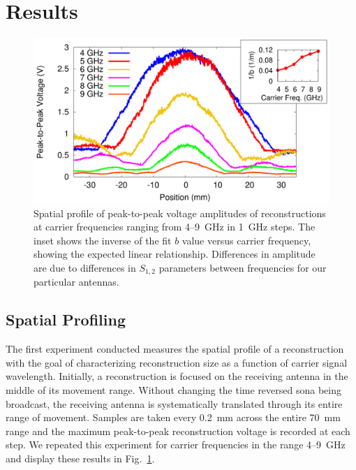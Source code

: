 \section{Results}


\begin{figure}[t!]
\includegraphics[width=\columnwidth]{figs/freq_profile.pdf}
\caption{Spatial profile of peak-to-peak voltage amplitudes of reconstructions
at carrier frequencies ranging from \numrange{4}{9}~GHz in 1~GHz
steps. The inset shows the inverse of the fit $b$ value versus carrier
frequency, showing the expected linear relationship. Differences in amplitude
are due to differences in $S_{1,2}$ parameters between frequencies for our particular antennas.}
\label{fig:freq_profile}
\end{figure}


\subsection{Spatial Profiling}
\label{sec:spatial}

The first experiment conducted measures the spatial profile of a reconstruction
with the goal of characterizing reconstruction size as a function of carrier
signal wavelength.
%
Initially, a reconstruction is focused on the receiving antenna in the middle of its
movement range.
%
Without changing the time reversed sona being broadcast, the receiving antenna
is systematically translated through its entire range of movement.
%
Samples are taken every 0.2~mm across the entire 70~mm range and the
maximum peak-to-peak reconstruction voltage is recorded at
each step.
%
We repeated this experiment for carrier frequencies in the range
\numrange{4}{9}~GHz and display these results in Fig.~\ref{fig:freq_profile}.



